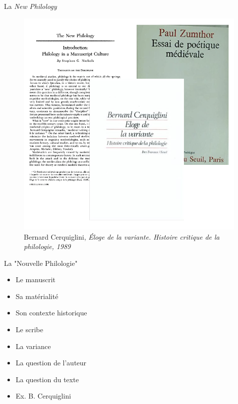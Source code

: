 \documentclass[11pt]{beamer}
\begin{document}
\begin{frame}{La \textit{New Philology}}
    \begin{minipage}{.45\textwidth}
        \begin{figure}
            \centering
            \includegraphics[width=1\linewidth]{img/new_philology.png}
            \caption{Bernard Cerquiglini, \textit{Éloge de la variante. Histoire critique de la philologie, 1989}}
        \end{figure}
    \end{minipage}%
    \hfill
    \begin{minipage}{.45\textwidth}
        \begin{block}{La "Nouvelle Philologie"}   
            \begin{itemize}
                \item Le manuscrit
                \item Sa matérialité
                \item Son contexte historique
                \item Le scribe
                \item La variance
                \item La question de l'auteur
                \item La question du texte
                \item  Ex. B. Cerquiglini
            \end{itemize}       
        \end{block}
    \end{minipage}


\end{frame}
\end{document}
